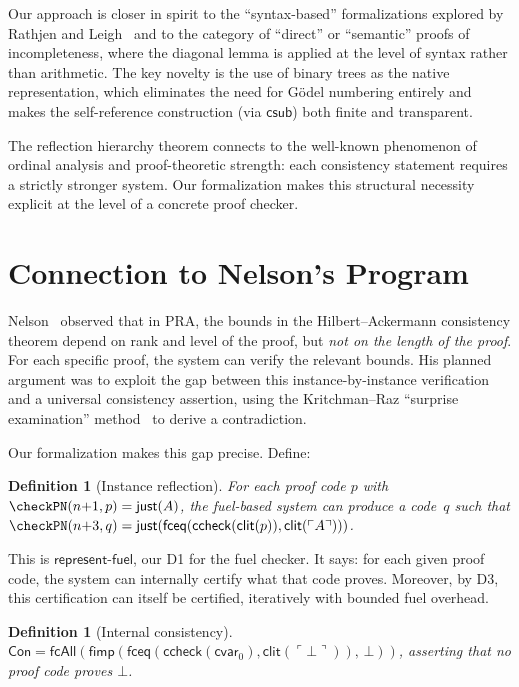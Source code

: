 \documentclass[11pt]{article}
\newtheorem{definition}[theorem]{Definition}
\newcommand{\enc}[1]{\ulcorner #1 \urcorner}
\newcommand{\csub}{\mathsf{csub}}
\newcommand{\clit}{\mathsf{clit}}
\newcommand{\ccheck}{\mathsf{ccheck}}
\newcommand{\fbot}{\bot}
\newcommand{\fimp}{\mathsf{fimp}}
\newcommand{\fceq}{\mathsf{fceq}}
\newcommand{\fcAll}{\mathsf{fcAll}}
\begin{document}
Our approach is closer in spirit to the ``syntax-based'' formalizations
explored by Rathjen and Leigh~\cite{Leigh2010} and to the category of
``direct'' or ``semantic'' proofs of incompleteness, where the diagonal
lemma is applied at the level of syntax rather than arithmetic. The key
novelty is the use of binary trees as the native representation, which
eliminates the need for G\"odel numbering entirely and makes the
self-reference construction (via $\csub$) both finite and transparent.

The reflection hierarchy theorem connects to the well-known phenomenon
of ordinal analysis and proof-theoretic strength: each consistency
statement requires a strictly stronger system. Our formalization makes
this structural necessity explicit at the level of a concrete proof
checker.

\section{Connection to Nelson's Program}
\label{sec:nelson}

Nelson~\cite{Nelson2015} observed that in PRA, the bounds in the
Hilbert--Ackermann consistency theorem depend on rank and level of
the proof, but \emph{not on the length of the proof}. For each
specific proof, the system can verify the relevant bounds. His planned
argument was to exploit the gap between this instance-by-instance
verification and a universal consistency assertion, using the
Kritchman--Raz ``surprise examination'' method~\cite{KritchmanRaz2010}
to derive a contradiction.

Our formalization makes this gap precise. Define:

\begin{definition}[Instance reflection]
For each proof code $p$ with $\checkPN(n{+}1, p) = \mathsf{just}(A)$,
the fuel-based system can produce a code~$q$ such that
$\checkPN(n{+}3, q) = \mathsf{just}(\fceq(\ccheck(\clit(p)),
\clit(\enc{A})))$.
\end{definition}

This is $\mathsf{represent\text{-}fuel}$, our D1 for the fuel
checker. It says: for each given proof code, the system can internally
certify what that code proves. Moreover, by D3, this certification can
itself be certified, iteratively with bounded fuel overhead.

\begin{definition}[Internal consistency]
$\mathsf{Con} = \fcAll(\fimp(\fceq(\ccheck(\mathsf{cvar}_0),
\clit(\enc{\fbot})),\, \fbot))$, asserting that no proof code proves
$\fbot$.
\end{definition}
\end{document}
